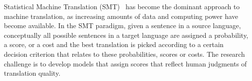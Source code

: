






Statistical Machine Translation (SMT)~\citep{brown-dellapietra-dellapietra-mercer-1993,lopez:2008:ACMComputingSurveys,koehn:2010:book}
has become the dominant approach to machine translation, as increasing
amounts of data and computing power have become available.
In the SMT paradigm, given a sentence in a source language,
conceptually all
possible sentences in a target language are assigned a probability, a
score, or a cost and the best translation is picked according to a certain
decision criterion that relates to these probabilities, scores or costs.
The research challenge is to develop models that assign scores that
reflect human judgments of translation quality.


